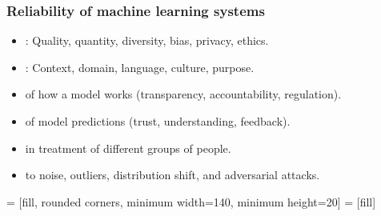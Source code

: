 \begin{frame}
    \frametitle{Reliability of machine learning systems}
    \begin{itemize}
        \item <1-> : Quality, quantity, diversity, bias, privacy, ethics.
        \item <1-> : Context, domain, language, culture, purpose.
        \vspace{1em}
        \item <2->  of how a model works (transparency, accountability, regulation).
        \item <2->  of model predictions (trust, understanding, feedback).
        \item <2->  in treatment of different groups of people.
        \item <2->  to noise, outliers, distribution shift, and adversarial attacks.
    \end{itemize}

\end{frame}


 = [fill, rounded corners, minimum width=140, minimum height=20]
 = [fill]


